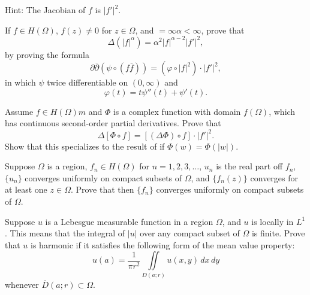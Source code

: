\begin{enumerate}
\begin{excopy}
Hint: The Jacobian of $f$ is \(|f'|^2\).
\end{excopy}


\begin{excopy}
 If \(f \in H(\Omega)\), \(f(z) \neq 0\) for \(z \in \Omega\),
and \(=\infty \alpha < \infty\), prove that
\begin{equation*}
\Delta(|f|^\alpha) = \alpha^2 |f|^{\alpha-2} |f'|^2,
\end{equation*}
by proving the formula
\begin{equation*}
\partial\overline{\partial}(\psi \circ (f\overline{f})) 
 = (\varphi \circ |f|^2)\cdot|f'|^2,
\end{equation*}
in which \(\psi\) twice differentiable on \((0, \infty)\) and
\begin{equation*}
\varphi(t) = t \psi''(t) + \psi'(t).
\end{equation*}

Assume \(f \in H(\Omega)m\) and \(\Phi\) is a complex function with domain
\(f(\Omega)\), which has continuous
second-order partial derivatives. Prove that
\begin{equation*}
 \Delta[\Phi \circ f] = [(\Delta \Phi) \circ f] \cdot|f'|^2.
\end{equation*}
Show that this specializes to the result of  
if \(\Phi(w) = \Phi(|w|)\).
\end{excopy}


\begin{excopy}
Suppose \(\Omega\) is a region, \(f_n\in H(\Omega)\) for \(n=1,2,3,\ldots\),
\(u_n\) is the real part off \(f_n\), \(\{u_n\}\) converges 
uniformly on compact subsets of \(\Omega\), and \(\{f_n(z)\}\) converges for
 at least one \(z \in \Omega\). Prove that then \(\{f_n\}\)
converges uniformly on compact subsets of \(\Omega\).
\end{excopy}


\begin{excopy}
Suppose $u$ is a Lebesgue measurable function in a region \(\Omega\), and $u$ 
is locally in \(L^1\). This means that
the integral of \(|u|\) over any compact subset of \(\Omega\) is finite.
 Prove that $u$ is harmonic if it satisfies the
following form of the mean value property:
\begin{equation*}
u(a) = \frac{1}{\pi r^2} \iint\limits_{D(a;r)}  u(x, y)\,dx\,dy
\end{equation*}
whenever \(\overline{D}(a;r) \subset \Omega\).
\end{excopy}



\end{enumerate}
